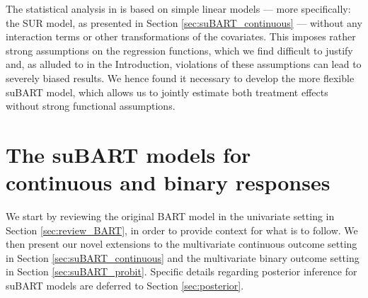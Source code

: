 \documentclass[aoas,preprint]{imsart}
\theoremstyle{plain}
\theoremstyle{definition}
\theoremstyle{remark}
\begin{document}
The statistical analysis in \citet{wiertsema2019cost} is based on simple linear models --- more specifically: the SUR model, as presented in Section \ref{sec:suBART_continuous} --- without any interaction terms or other transformations of the covariates. This imposes rather strong assumptions on the regression functions, which we find difficult to justify and, as alluded to in the Introduction, violations of these assumptions can lead to severely biased results. We hence found it necessary to develop the more flexible suBART model, which allows us to jointly estimate both treatment effects without strong functional assumptions.

\section{The suBART models for continuous and binary responses}\label{sec:suBART}
We start by reviewing the original BART model in the univariate setting in Section \ref{sec:review_BART}, in order to provide context for what is to follow. We then present our novel extensions to the multivariate continuous outcome setting in Section \ref{sec:suBART_continuous} and the multivariate binary outcome setting in Section \ref{sec:suBART_probit}. Specific details regarding posterior inference for suBART models are deferred to Section \ref{sec:posterior}.
\end{document}
